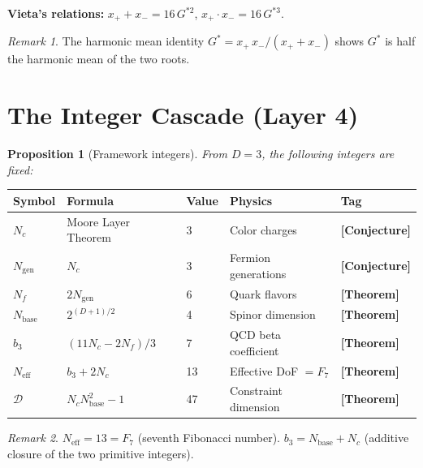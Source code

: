 \documentclass[12pt]{article}
\newtheorem{proposition}[theorem]{Proposition}
\theoremstyle{definition}
\theoremstyle{remark}
\newtheorem{remark}{Remark}[section]
\newcommand{\epi}[1]{\textnormal{{\small\sffamily\bfseries\color{ftdblue}[#1]}}}
\begin{document}
\noindent\textbf{Vieta's relations:}
$x_+ + x_- = 16\,G^{*2}$,\quad
$x_+\cdot x_- = 16\,G^{*3}$.

\begin{remark}
The harmonic mean identity $G^{*} = x_+\,x_-/(x_+ + x_-)$ shows $G^{*}$ is half the harmonic mean of the two roots.
\end{remark}

\section{The Integer Cascade (Layer 4)}

\begin{proposition}[Framework integers]\label{prop:integers}
From $D = 3$, the following integers are fixed:
\end{proposition}

\begin{center}\small
\begin{tabular}{@{}lllll@{}}
\toprule
\textbf{Symbol} & \textbf{Formula} & \textbf{Value} & \textbf{Physics} & \textbf{Tag} \\
\midrule
$N_c$ & Moore Layer Theorem & 3 & Color charges & \epi{Conjecture} \\
$N_\text{gen}$ & $N_c$ & 3 & Fermion generations & \epi{Conjecture} \\
$N_f$ & $2N_\text{gen}$ & 6 & Quark flavors & \epi{Theorem} \\
$N_\text{base}$ & $2^{(D+1)/2}$ & 4 & Spinor dimension & \epi{Theorem} \\
$b_3$ & $(11N_c - 2N_f)/3$ & 7 & QCD beta coefficient & \epi{Theorem} \\
$N_\text{eff}$ & $b_3 + 2N_c$ & 13 & Effective DoF $= F_7$ & \epi{Theorem} \\
$\mathcal{D}$ & $N_c N_\text{base}^2 - 1$ & 47 & Constraint dimension & \epi{Theorem} \\
\bottomrule
\end{tabular}
\end{center}

\begin{remark}
$N_\text{eff} = 13 = F_7$ (seventh Fibonacci number).
$b_3 = N_\text{base} + N_c$ (additive closure of the two primitive integers).
\end{remark}

\end{document}

